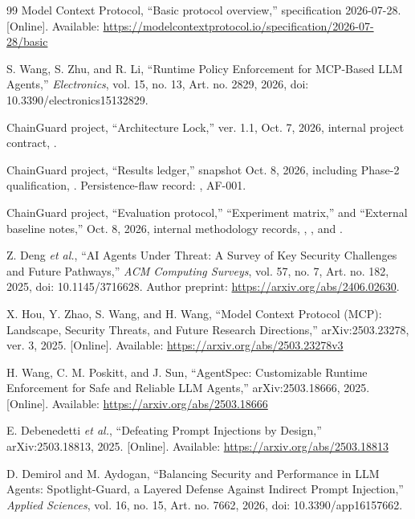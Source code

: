 \documentclass[conference]{IEEEtran}
\begin{document}
\begin{thebibliography}{99}
 Model Context Protocol, ``Basic protocol overview,'' specification 2026-07-28. [Online]. Available: \url{https://modelcontextprotocol.io/specification/2026-07-28/basic}

 S. Wang, S. Zhu, and R. Li, ``Runtime Policy Enforcement for MCP-Based LLM Agents,'' \emph{Electronics}, vol. 15, no. 13, Art. no. 2829, 2026, doi: 10.3390/electronics15132829.

 ChainGuard project, ``Architecture Lock,'' ver. 1.1, Oct. 7, 2026, internal project contract, .

 ChainGuard project, ``Results ledger,'' snapshot Oct. 8, 2026, including Phase-2 qualification, . Persistence-flaw record: , AF-001.

 ChainGuard project, ``Evaluation protocol,'' ``Experiment matrix,'' and ``External baseline notes,'' Oct. 8, 2026, internal methodology records, , , and .

 Z. Deng \emph{et al.}, ``AI Agents Under Threat: A Survey of Key Security Challenges and Future Pathways,'' \emph{ACM Computing Surveys}, vol. 57, no. 7, Art. no. 182, 2025, doi: 10.1145/3716628. Author preprint: \url{https://arxiv.org/abs/2406.02630}.

 X. Hou, Y. Zhao, S. Wang, and H. Wang, ``Model Context Protocol (MCP): Landscape, Security Threats, and Future Research Directions,'' arXiv:2503.23278, ver. 3, 2025. [Online]. Available: \url{https://arxiv.org/abs/2503.23278v3}

 H. Wang, C. M. Poskitt, and J. Sun, ``AgentSpec: Customizable Runtime Enforcement for Safe and Reliable LLM Agents,'' arXiv:2503.18666, 2025. [Online]. Available: \url{https://arxiv.org/abs/2503.18666}

 E. Debenedetti \emph{et al.}, ``Defeating Prompt Injections by Design,'' arXiv:2503.18813, 2025. [Online]. Available: \url{https://arxiv.org/abs/2503.18813}

 D. Demirol and M. Aydogan, ``Balancing Security and Performance in LLM Agents: Spotlight-Guard, a Layered Defense Against Indirect Prompt Injection,'' \emph{Applied Sciences}, vol. 16, no. 15, Art. no. 7662, 2026, doi: 10.3390/app16157662.


\end{thebibliography}
\end{document}
